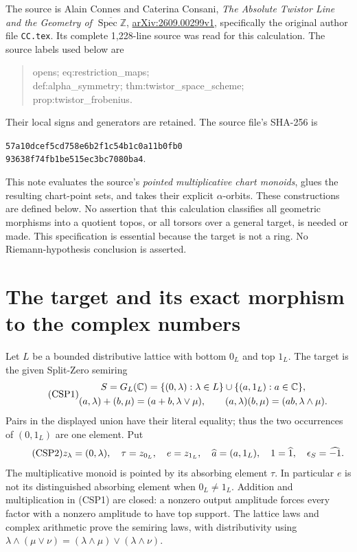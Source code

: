 

The source is Alain Connes and Caterina Consani, \emph{The Absolute Twistor
Line and the Geometry of $\overline{\operatorname{Spec}\mathbb Z}$},
\href{https://arxiv.org/abs/2609.00299v1}{arXiv:2609.00299v1}, specifically
the original author file \texttt{CC.tex}.  Its complete 1,228-line source
was read for this calculation.  The source labels used below are
\begin{quote}\ttfamily
opens; eq:restriction\_maps;\\
def:alpha\_symmetry; thm:twistor\_space\_scheme;\\
prop:twistor\_frobenius.
\end{quote}
Their local signs and generators are
retained.  The source file's SHA-256 is
\begin{center}\small\texttt{57a10dcef5cd758e6b2f1c54b1c0a11b0fb0}\\
\texttt{93638f74fb1be515ec3bc7080ba4}.\end{center}

This note evaluates the source's \emph{pointed multiplicative chart
monoids}, glues the resulting chart-point sets, and takes their explicit
$\alpha$-orbits.  These constructions are defined below.  No assertion
that this calculation classifies all geometric morphisms into a quotient
topos, or all torsors over a general target, is needed or made.  This
specification is essential because the target is not a ring.  No
Riemann-hypothesis conclusion is asserted.

\section{The target and its exact morphism to the complex numbers}

Let $L$ be a bounded distributive lattice with bottom $0_L$ and top $1_L$.
The target is the given Split-Zero semiring
\begin{equation}\tag{CSP1}
 \begin{gathered}
 S=G_L(\mathbb C)=\{(0,\lambda):\lambda\in L\}\cup
                   \{(a,1_L):a\in\mathbb C\},\\
 (a,\lambda)+(b,\mu)=(a+b,\lambda\vee\mu),\qquad
 (a,\lambda)(b,\mu)=(ab,\lambda\wedge\mu).
 \end{gathered}
\end{equation}
Pairs in the displayed union have their literal equality; thus the two
occurrences of $(0,1_L)$ are one element.  Put
\begin{equation}\tag{CSP2}
 z_\lambda=(0,\lambda),\quad \tau=z_{0_L},\quad e=z_{1_L},\quad
 \widehat a=(a,1_L),\quad 1=\widehat1,\quad \epsilon_S=\widehat{-1}.
\end{equation}
The multiplicative monoid is pointed by its absorbing element $\tau$.
In particular $e$ is not its distinguished absorbing element when
$0_L\ne1_L$.  Addition and multiplication in (CSP1) are closed: a
nonzero output amplitude forces every factor with a nonzero amplitude
to have top support.  The lattice laws and complex arithmetic prove
the semiring laws, with distributivity using
$\lambda\wedge(\mu\vee\nu)=(\lambda\wedge\mu)\vee
(\lambda\wedge\nu)$.

